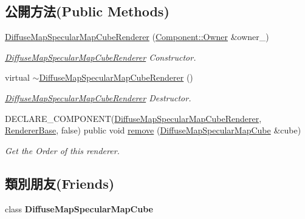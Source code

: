 \subsection*{公開方法(Public Methods)}
\begin{DoxyCompactItemize}
\item 
\hyperlink{class_magnum_1_1_diffuse_map_specular_map_cube_renderer_a65810ac056ff0200cd27e1081c41b2ae}{Diffuse\+Map\+Specular\+Map\+Cube\+Renderer} (\hyperlink{class_magnum_1_1_component_1_1_owner}{Component\+::\+Owner} \&owner\+\_\+)
\begin{DoxyCompactList}\small\item\em \hyperlink{class_magnum_1_1_diffuse_map_specular_map_cube_renderer}{Diffuse\+Map\+Specular\+Map\+Cube\+Renderer} Constructor. \end{DoxyCompactList}\item 
virtual \hyperlink{class_magnum_1_1_diffuse_map_specular_map_cube_renderer_a55c60b5f14ff8e9ad0c0280e66ee39f7}{$\sim$\+Diffuse\+Map\+Specular\+Map\+Cube\+Renderer} ()
\begin{DoxyCompactList}\small\item\em \hyperlink{class_magnum_1_1_diffuse_map_specular_map_cube_renderer}{Diffuse\+Map\+Specular\+Map\+Cube\+Renderer} Destructor. \end{DoxyCompactList}\item 
D\+E\+C\+L\+A\+R\+E\+\_\+\+C\+O\+M\+P\+O\+N\+E\+NT(\hyperlink{class_magnum_1_1_diffuse_map_specular_map_cube_renderer}{Diffuse\+Map\+Specular\+Map\+Cube\+Renderer}, \hyperlink{class_magnum_1_1_renderer_base}{Renderer\+Base}, false) public void \hyperlink{class_magnum_1_1_diffuse_map_specular_map_cube_renderer_a1f74a1a086edaa7c142682c2b8648678}{remove} (\hyperlink{class_magnum_1_1_diffuse_map_specular_map_cube}{Diffuse\+Map\+Specular\+Map\+Cube} \&cube)
\begin{DoxyCompactList}\small\item\em Get the Order of this renderer. \end{DoxyCompactList}\end{DoxyCompactItemize}
\subsection*{類別朋友(Friends)}
\begin{DoxyCompactItemize}
\item 
class {\bfseries Diffuse\+Map\+Specular\+Map\+Cube}\hypertarget{class_magnum_1_1_diffuse_map_specular_map_cube_renderer_aba62c454ef12905f7e760ee7c8129df9}{}\label{class_magnum_1_1_diffuse_map_specular_map_cube_renderer_aba62c454ef12905f7e760ee7c8129df9}

\end{DoxyCompactItemize}
